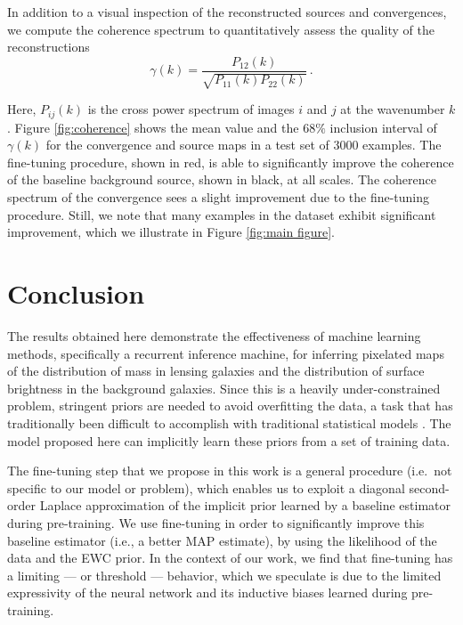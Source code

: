 In addition to a visual inspection of the reconstructed sources 
and convergences, we compute 
the coherence spectrum to quantitatively assess the quality of the reconstructions
\begin{equation}\label{eq:coherence} 
        \gamma(k) = \frac{P_{12}(k)}{\sqrt{P_{11}(k) P_{22}(k)}} \, .
\end{equation}

Here, $P_{ij}(k)$ is the cross power spectrum of images $i$ and $j$ at 
the wavenumber $k$. Figure \ref{fig:coherence} shows the mean value and the $68\%$ inclusion interval of $\gamma(k)$ 
for the convergence and source maps in a test set of 3000 examples. 
The fine-tuning 
procedure, shown in red, is able to significantly improve the coherence of the baseline background 
source, shown in black, at all scales. 
The coherence spectrum of the convergence sees a slight improvement due to the fine-tuning procedure.
Still, we note that many examples in the dataset exhibit significant 
improvement, which we illustrate in Figure \ref{fig:main figure}.


\section{Conclusion}\label{sec:conclusion}
The results obtained here demonstrate the effectiveness of machine learning methods, specifically a recurrent inference machine, for inferring pixelated maps of the distribution of mass in lensing galaxies and the distribution of surface brightness in the background galaxies. Since this is a heavily under-constrained problem, stringent priors are needed to avoid overfitting the data, a task that has traditionally been difficult to accomplish with traditional statistical models \citep[e.g., ][]{Saha1997}. The model proposed here can implicitly learn these priors from a set of training data. 

The fine-tuning step that we propose in this work is a general procedure (i.e.\ not specific to our model or problem), which enables us to exploit a diagonal second-order Laplace approximation of the implicit prior learned by a baseline estimator during pre-training. We use fine-tuning in order to significantly improve this baseline estimator (i.e., a better MAP estimate), by using the likelihood of the data and the EWC prior. In the context of our work, we find that fine-tuning has a limiting --- or threshold --- behavior, which we speculate is due to the limited expressivity of the neural network and its inductive biases learned during pre-training.

